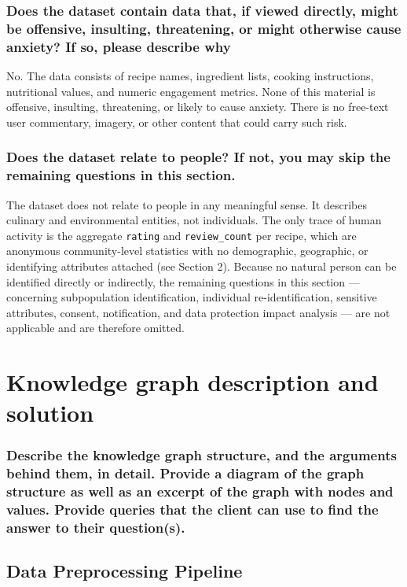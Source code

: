 \documentclass{article}
\newcommand{\question}[1]{#1}
\begin{document}
\question{\subsubsection*{Does the dataset contain data that, if viewed directly, might be offensive, insulting, threatening, or might otherwise cause anxiety? If so,
please describe why}}

No. The data consists of recipe names, ingredient lists, cooking instructions, nutritional values, and numeric engagement metrics. None of this material is offensive, insulting, threatening, or likely to cause anxiety. There is no free-text user commentary, imagery, or other content that could carry such risk.

\question{\subsubsection*{Does the dataset relate to people? If not, you may skip the remaining
questions in this section.}}

The dataset does not relate to people in any meaningful sense. It describes culinary and environmental entities, not individuals. The only trace of human activity is the aggregate \texttt{rating} and \texttt{review\_count} per recipe, which are anonymous community-level statistics with no demographic, geographic, or identifying attributes attached (see Section 2). Because no natural person can be identified directly or indirectly, the remaining questions in this section --- concerning subpopulation identification, individual re-identification, sensitive attributes, consent, notification, and data protection impact analysis --- are not applicable and are therefore omitted.


\section{Knowledge graph description and solution}
\label{sec:solution}
\question{\subsubsection*{Describe the knowledge graph structure, and the arguments behind them, in detail. Provide a diagram of the graph structure as well as an excerpt of the graph with nodes and values. Provide queries that the client can use to find the answer to their question(s).}}

\subsection{Data Preprocessing Pipeline}
\end{document}
